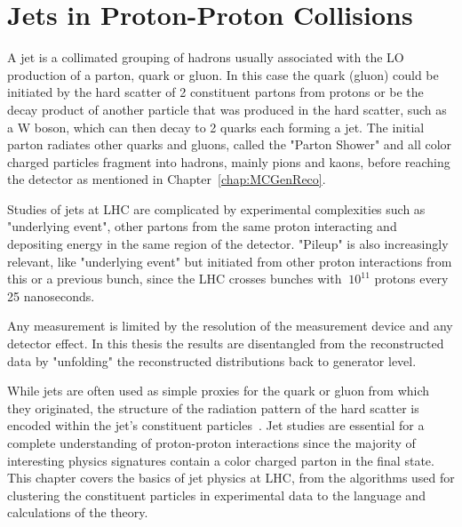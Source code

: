 



\chapter{Jets in Proton-Proton Collisions}%



A jet is a collimated grouping of hadrons usually associated with the LO production of a parton, quark or gluon. In this case the quark (gluon) could be initiated by the hard scatter of 2 constituent partons from protons or be the decay product of another particle that was produced in the hard scatter, such as a W boson, which can then decay to 2 quarks each forming a jet. The initial parton radiates other quarks and gluons, called the "Parton Shower" and all color charged particles fragment into hadrons, mainly pions and kaons,  before reaching the detector as mentioned in Chapter~\ref{chap:MCGenReco}.

Studies of jets at LHC are complicated by experimental complexities such as "underlying event", other partons from the same proton interacting and depositing energy in the same region of the detector. "Pileup" is also increasingly relevant, like "underlying event" but initiated from other proton interactions from this or a previous bunch, since the LHC crosses bunches with $~10^{11}$ protons every 25 nanoseconds.



Any measurement is limited by the resolution of the measurement device and any detector effect. In this thesis the results are disentangled from the reconstructed data by "unfolding" the reconstructed distributions back to generator level.

While jets are often used as simple proxies for the quark or gluon from which they originated, the structure of the radiation pattern of the hard scatter is encoded within the jet's constituent particles~\cite{Asquith:2018igt}. Jet studies are essential for a complete understanding of proton-proton interactions since the majority of interesting physics signatures contain a color charged parton in the final state. This chapter covers the basics of jet physics at LHC, from the algorithms used for clustering the constituent particles in experimental data to the language and calculations of the theory.




